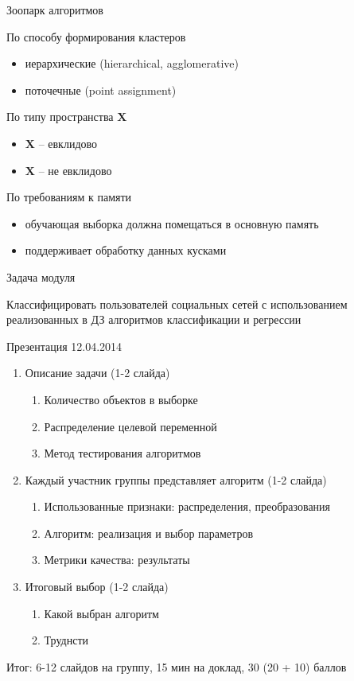 \documentclass[10pt,a4paper]{beamer}
\begin{document}

\begin{frame}{Зоопарк алгоритмов}

По способу формирования кластеров
\begin{itemize}
\item иерархические (hierarchical, agglomerative)
\item поточечные (point assignment)
\end{itemize}

По типу пространства $\mathbf{X}$
\begin{itemize}
\item $\mathbf{X}$ -- евклидово
\item $\mathbf{X}$ -- не евклидово
\end{itemize}

По требованиям к памяти
\begin{itemize}
\item обучающая выборка должна помещаться в основную память
\item поддерживает обработку данных кусками
\end{itemize}

\end{frame}


\begin{frame}{Задача модуля}

Классифицировать пользователей социальных сетей с использованием реализованных в ДЗ алгоритмов классификации и регрессии

\vspace{1em}
Презентация 12.04.2014
\begin{enumerate}
\item Описание задачи (1-2 слайда)
	\begin{enumerate}
	\item Количество объектов в выборке
	\item Распределение целевой переменной
	\item Метод тестирования алгоритмов
	\end{enumerate}
\item Каждый участник группы представляет алгоритм (1-2 слайда)
	\begin{enumerate}
	\item Использованные признаки: распределения, преобразования
	\item Алгоритм: реализация и выбор параметров
	\item Метрики качества: результаты
	\end{enumerate}
\item Итоговый выбор (1-2 слайда)
	\begin{enumerate}
	\item Какой выбран алгоритм
	\item Труднсти
	\end{enumerate}
\end{enumerate}
Итог: 6-12 слайдов на группу, 15 мин на доклад, 30 (20 + 10) баллов

\end{frame}
\end{document}
